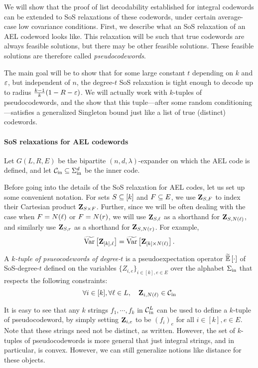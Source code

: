 We will show that the proof of list decodability established for integral codewords can be extended to SoS relaxations of these codewords, under certain average-case low covariance conditions. 
First, we describe what an SoS relaxation of an AEL codeword looks like. This relaxation will be such that true codewords are always feasible solutions, but there may be other feasible solutions. These feasible solutions are therefore called \textit{pseudocodewords}.

The main goal will be to show that for some large constant $t$ depending on $k$ and $\varepsilon$, but independent of $n$, the degree-$t$ SoS relaxation is tight enough to decode up to radius $\frac{k-1}{k}(1-R-\varepsilon)$. We will actually work with $k$-tuples of pseudocodewords, and the show that this tuple---after some random conditioning---satisfies a generalized Singleton bound just like a list of true (distinct) codewords.


\paragraph{SoS relaxations for AEL codewords}
Let $G(L,R,E)$ be the bipartite $(n,d,\lambda)$-expander on which the AEL code is defined, and let ${\mathcal C}_{\mathrm{in}}\subseteq \Sigma_{\mathrm{in}}^d$ be the inner code. 

Before going into the details of the SoS relaxation for AEL codes, let us set up some convenient notation. For sets $S\subseteq [k]$ and $F \subseteq E$, we use ${ \mathbf{Z} }_{S,F}$ to index their Cartesian product ${ \mathbf{Z} }_{S \times F}$. Further, since we will be often dealing with the case when $F=N({ \ell })$ or $F=N({ r })$, we will use ${ \mathbf{Z} }_{S,{ \ell }}$ as a shorthand for ${ \mathbf{Z} }_{S,N({ \ell })}$, and similarly use ${ \mathbf{Z} }_{S,{ r }}$ as a shorthand for ${ \mathbf{Z} }_{S,N({ r })}$. For example,
\[
	\tildeVar{\zee_{[k],\li}} = \tildeVar{ \zee_{[k] \times N(\li)}}.
\]


\begin{definition}\label{def:k_tuple}
A \emph{$k$-tuple of psueocodewords of degree-$t$} is a pseudoexpectation operator $\tildeEx{\cdot}$ of SoS-degree-$t$ defined on the variables $\{Z_{i,e}\}_{i\in [k], e\in E}$ over the alphabet $\Sigma_{\mathrm{in}}$ that respects the following constraints:
\[
	\forall i\in [k], \forall { \ell } \in L,~~~ { \mathbf{Z} }_{i,N({ \ell })} \in {\mathcal C}_{\mathrm{in}}
\] 
\end{definition}

It is easy to see that any $k$ strings $f_1,\cdots ,f_k$ in ${\mathcal C}_{\mathrm{in}}^L$ can be used to define a $k$-tuple of pseudocodeword, by simply setting ${ \mathbf{Z} }_{i,e}$ to be $(f_i)_e$ for all $i \in [k], e\in E$. Note that these strings need not be distinct, as written. However, the set of $k$-tuples of pseudocodewords is more general that just integral strings, and in particular, is convex. However, we can still generalize notions like distance for these objects.

